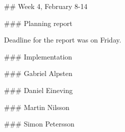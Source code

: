 ## Week 4, February 8-14


### Planning report

Deadline for the report was on Friday.

### Implementation


### Gabriel Alpsten

### Daniel Eineving

### Martin Nilsson

### Simon Petersson
